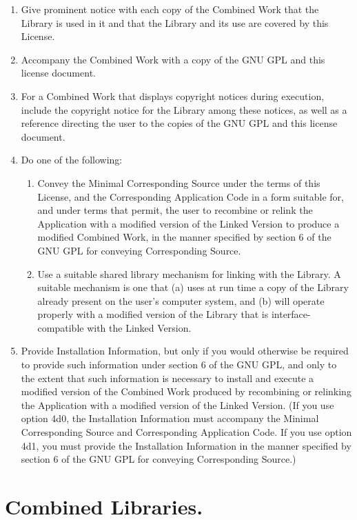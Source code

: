 \documentclass[a4paper, 12pt]{article}
\begin{document}
\begin{enumerate}[label=\alph*)]
\item Give prominent notice with each copy of the Combined Work that the Library is used in it and that the Library and its use are covered by this License.
\item Accompany the Combined Work with a copy of the GNU GPL and this license document.
\item For a Combined Work that displays copyright notices during execution, include the copyright notice for the Library among these notices, as well as a reference directing the user to the copies of the GNU GPL and this license document.
\item Do one of the following:
\begin{enumerate}[label=\arabic*), start=0]
\item Convey the Minimal Corresponding Source under the terms of this License, and the Corresponding Application Code in a form suitable for, and under terms that permit, the user to recombine or relink the Application with a modified version of the Linked Version to produce a modified Combined Work, in the manner specified by section 6 of the GNU GPL for conveying Corresponding Source.
\item Use a suitable shared library mechanism for linking with the Library. A suitable mechanism is one that (a) uses at run time a copy of the Library already present on the user's computer system, and (b) will operate properly with a modified version of the Library that is interface-compatible with the Linked Version.
\end{enumerate}
\item  Provide Installation Information, but only if you would otherwise be required to provide such information under section 6 of the GNU GPL, and only to the extent that such information is necessary to install and execute a modified version of the Combined Work produced by recombining or relinking the Application with a modified version of the Linked Version. (If you use option 4d0, the Installation Information must accompany the Minimal Corresponding Source and Corresponding Application Code. If you use option 4d1, you must provide the Installation Information in the manner specified by section 6 of the GNU GPL for conveying Corresponding Source.)
\end{enumerate}

\section{Combined Libraries.}
\end{document}
